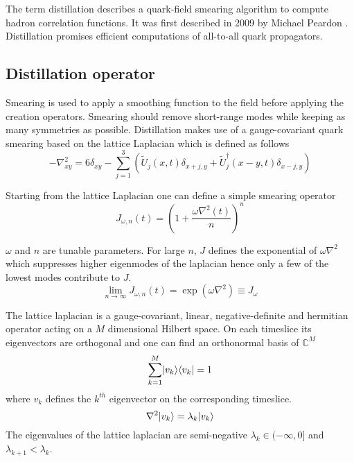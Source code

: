 	
The term distillation describes a quark-field smearing algorithm to compute hadron correlation functions. It was first described in 2009 by Michael Peardon \cite{distillation_paper}. Distillation promises efficient computations of all-to-all quark propagators.\\

\subsection{Distillation operator}
    Smearing is used to apply a smoothing function to the field before applying the creation operators. Smearing should remove short-range modes while keeping as many symmetries as possible. Distillation makes use of a gauge-covariant quark smearing based on the lattice Laplacian which is defined as follows
	\begin{equation}
	    -\nabla^2_{xy} = 6\delta_{xy} - \sum^3_{j=1}(\tilde{U}_j(x,t)\delta_{x+j,y} + \tilde{U}^\dagger_j(x-y,t)\delta_{x-j,y})
	\end{equation}
	
	Starting from the lattice Laplacian one can define a simple smearing operator
	\begin{equation}
	    J_{\omega,n}(t) = (1+\frac{\omega\nabla^2(t)}{n})^n
	\end{equation}
	
	$\omega$ and $n$ are tunable parameters. For large $n$, $J$ defines the exponential of $\omega\nabla^2$ which suppresses higher eigenmodes of the laplacian hence only a few of the lowest modes contribute to $J$. %
	\begin{equation}
        \lim_{n\rightarrow\infty} J_{\omega,n}(t) = \exp(\omega\nabla^2) \equiv J_\omega
	\end{equation}
	
    The lattice laplacian is a gauge-covariant, linear, negative-definite and hermitian operator acting on a $M$ dimensional Hilbert space. On each timeslice its eigenvectors are orthogonal and one can find an orthonormal basis of $\mathbb{C}^M$
    \cite{bachelor_thesis_jan}
    \begin{equation}\label{othonormal_eigenvectors}
        \sum^M_{k=1}\lvert v_k\rangle\langle v_k\rvert = 1
    \end{equation}
    where $v_k$ defines the $k^{th}$ eigenvector on the corresponding timeslice.
    \begin{equation}
        \nabla^2\lvert v_k\rangle = \lambda_k\lvert v_k\rangle
    \end{equation}
    The eigenvalues of the lattice laplacian are semi-negative $\lambda_k \in (-\infty,0]$ and $\lambda_{k+1} < \lambda_k$.\\
    
